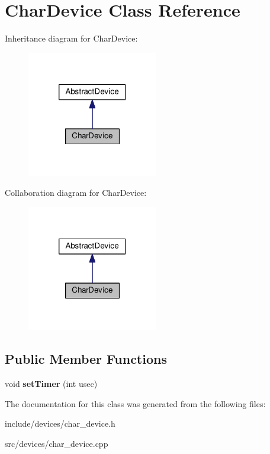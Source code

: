 \hypertarget{classCharDevice}{\section{\-Char\-Device \-Class \-Reference}
\label{d8/d4f/classCharDevice}
}


\-Inheritance diagram for \-Char\-Device\-:\nopagebreak
\begin{figure}[H]
\begin{center}
\leavevmode
\includegraphics[width=162pt]{da/d98/classCharDevice__inherit__graph}
\end{center}
\end{figure}


\-Collaboration diagram for \-Char\-Device\-:\nopagebreak
\begin{figure}[H]
\begin{center}
\leavevmode
\includegraphics[width=162pt]{d2/db9/classCharDevice__coll__graph}
\end{center}
\end{figure}
\subsection*{\-Public \-Member \-Functions}
\begin{DoxyCompactItemize}
\item 
\hypertarget{classCharDevice_a8689c0a03b971367322a9dd25bcfb7db}{void {\bfseries set\-Timer} (int usec)}\label{d8/d4f/classCharDevice_a8689c0a03b971367322a9dd25bcfb7db}

\end{DoxyCompactItemize}


\-The documentation for this class was generated from the following files\-:\begin{DoxyCompactItemize}
\item 
include/devices/char\-\_\-device.\-h\item 
src/devices/char\-\_\-device.\-cpp\end{DoxyCompactItemize}
